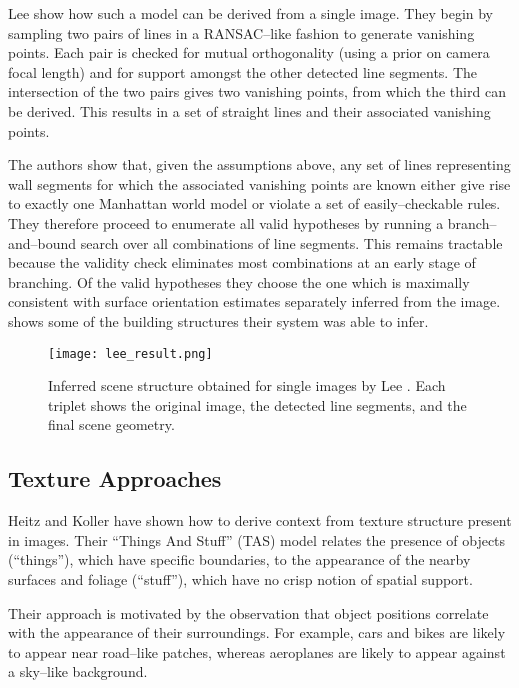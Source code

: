 Lee \etal show how such a model can be derived from a single
image. They begin by sampling two pairs of lines in a RANSAC--like
fashion to generate vanishing points. Each pair is checked for mutual
orthogonality (using a prior on camera focal length) and for support
amongst the other detected line segments. The intersection of the two
pairs gives two vanishing points, from which the third can be
derived. This results in a set of straight lines and their associated
vanishing points.

The authors show that, given the assumptions above, any set of lines
representing wall segments for which the associated vanishing points
are known either give rise to exactly one Manhattan world model or
violate a set of easily--checkable rules. They therefore proceed to
enumerate all valid hypotheses by running a branch--and--bound search
over all combinations of line segments. This remains tractable because
the validity check eliminates most combinations at an early stage of
branching. Of the valid hypotheses they choose the one which is
maximally consistent with surface orientation estimates separately
inferred from the image.  shows some of the
building structures their system was able to infer.

\begin{figure}[htp]
\centering
\texttt{[image: lee\_result.png]}
\caption{Inferred scene structure obtained for single images by Lee
  \etal \cite{Lee09}. Each triplet shows the original image, the
  detected line segments, and the final scene geometry.}
\label{fig:lee-result}
\end{figure}

\subsection{Texture Approaches}

Heitz and Koller \cite{Heitz08} have shown how to derive context from
texture structure present in images. Their ``Things And Stuff'' (TAS)
model relates the presence of objects (``things''), which have
specific boundaries, to the appearance of the nearby surfaces and
foliage (``stuff''), which have no crisp notion of spatial support.

Their approach is motivated by the observation that object positions
correlate with the appearance of their surroundings. For example, cars
and bikes are likely to appear near road--like patches, whereas
aeroplanes are likely to appear against a sky--like background.

